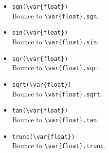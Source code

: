 \begin{itemize}
\item \lstinline|sgn(\var{float})|\\
  Bounce to \lstinline|\var{float}.sgn|.

\item \lstinline|sin(\var{float})|\\
  Bounce to \lstinline|\var{float}.sin|.

\item \lstinline|sqr(\var{float})|\\
  Bounce to \lstinline|\var{float}.sqr|.

\item \lstinline|sqrt(\var{float})|\\
  Bounce to \lstinline|\var{float}.sqrt|.

\item \lstinline|tan(\var{float})|\\
  Bounce to \lstinline|\var{float}.tan|.

\item \lstinline|trunc(\var{float})|\\
  Bounce to \lstinline|\var{float}.trunc|.
\end{itemize}


